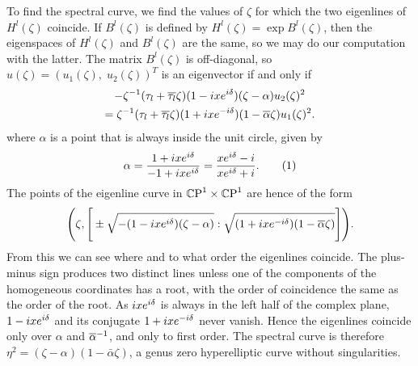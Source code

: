 \documentclass{article}
\begin{document}
To find the spectral curve, we find the values of $\zeta$ for which the two eigenlines of $H^l(\zeta)$ coincide. If $B^l(\zeta)$ is defined by $H^l(\zeta) = \exp B^l(\zeta)$, then the eigenspaces of $H^l(\zeta)$ and $B^l(\zeta)$ are the same, so we may do our computation with the latter. The matrix $B^l(\zeta)$ is off-diagonal, so $u(\zeta) = (u_1(\zeta),\; u_2(\zeta))^T$ is an eigenvector if and only if
\begin{multline*}
-\zeta^{-1}(\tau_l + \overline{\tau_l}\zeta)(1 - i x e^{i \delta})(\zeta-\alpha) u_2(\zeta)^2 \\
= \zeta^{-1}(\tau_l + \overline{\tau_l}\zeta)(1+i xe^{-i \delta}) (1-\overline{\alpha}\zeta) u_1(\zeta)^2.
\end{multline*}
where $\alpha$ is a point that is always inside the unit circle, given by
\[
\alpha = \frac{1+\iu x e^{\iu \delta}}{-1+\iu x e^{\iu \delta}}
= \frac{x e^{\iu \delta} - \iu}{x e^{\iu \delta} +\iu}.
\labelthis{eqn:def branch point genus zero}
\]
The points of the eigenline curve in $\mathbb{C}\text{P}^1 \times\mathbb{C}\text{P}^1$ are hence of the form
\[
\Bigg( \zeta, \Bigg[\pm \sqrt{-(1 - i x e^{i \delta})(\zeta-\alpha)} : \sqrt{(1+i xe^{-i \delta}) (1-\overline{\alpha}\zeta)} \Bigg] \Bigg).
\]
From this we can see where and to what order the eigenlines coincide. The plus-minus sign produces two distinct lines unless one of the components of the homogeneous coordinates has a root, with the order of coincidence the same as the order of the root. As $i x e^{i \delta}$ is always in the left half of the complex plane, $1 - i x e^{i \delta}$ and its conjugate $1 + i x e^{-i \delta}$ never vanish. Hence the eigenlines coincide only over $\alpha$ and $\overline{\alpha}^{-1}$, and only to first order. The spectral curve is therefore $\eta^2 = (\zeta-\alpha)(1-\bar{\alpha}\zeta)$, a genus zero hyperelliptic curve without singularities.
\end{document}
